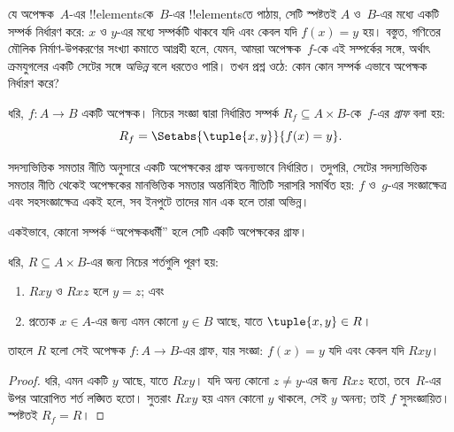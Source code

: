 \documentclass[../../../include/open-logic-section]{subfiles}
\begin{document}


\begin{explain}
যে অপেক্ষক~$A$-এর !!{element}sকে~$B$-এর !!{element}sতে পাঠায়, সেটি স্পষ্টতই $A$ ও~$B$-এর মধ্যে একটি সম্পর্ক নির্ধারণ করে: $x$ ও $y$-এর মধ্যে সম্পর্কটি থাকবে যদি এবং কেবল যদি $f(x) = y$ হয়। বস্তুত, গণিতের মৌলিক নির্মাণ-উপকরণের সংখ্যা কমাতে আগ্রহী হলে, যেমন, আমরা অপেক্ষক~$f$-কে এই সম্পর্কের সঙ্গে, অর্থাৎ ক্রমযুগলের একটি সেটের সঙ্গে \emph{অভিন্ন} বলে ধরতেও পারি। তখন প্রশ্ন ওঠে: কোন কোন সম্পর্ক এভাবে অপেক্ষক নির্ধারণ করে?
\end{explain}

\begin{defn}[অপেক্ষকের গ্রাফ] ধরি, $f\colon A \to B$ একটি অপেক্ষক।
নিচের সংজ্ঞা দ্বারা নির্ধারিত সম্পর্ক $R_f \subseteq A \times B$-কে~$f$-এর \emph{গ্রাফ} বলা হয়:
\[
R_f = \Setabs{\tuple{x,y}}{f(x) = y}.
\]
\end{defn}

\begin{explain}
সদস্যভিত্তিক সমতার নীতি অনুসারে একটি অপেক্ষকের গ্রাফ অনন্যভাবে নির্ধারিত। তদুপরি, সেটের সদস্যভিত্তিক সমতার নীতি থেকেই অপেক্ষকের মানভিত্তিক সমতার অন্তর্নিহিত নীতিটি সরাসরি সমর্থিত হয়: $f$ ও~$g$-এর সংজ্ঞাক্ষেত্র এবং সহসংজ্ঞাক্ষেত্র একই হলে, সব ইনপুটে তাদের মান এক হলে তারা অভিন্ন।

একইভাবে, কোনো সম্পর্ক ``অপেক্ষকধর্মী'' হলে সেটি একটি অপেক্ষকের গ্রাফ।
\end{explain}

\begin{prop}
ধরি, $R \subseteq A \times B$-এর জন্য নিচের শর্তগুলি পূরণ হয়:
\begin{enumerate}
\item $Rxy$ ও $Rxz$ হলে $y = z$; এবং
\item প্রত্যেক $x \in A$-এর জন্য এমন কোনো $y \in B$ আছে, যাতে $\tuple{x,
y} \in R$।
\end{enumerate}
তাহলে $R$ হলো সেই অপেক্ষক $f\colon A \to B$-এর গ্রাফ, যার সংজ্ঞা: $f(x) = y$ যদি এবং কেবল যদি $Rxy$।
\end{prop}

\begin{proof}
ধরি, এমন একটি $y$ আছে, যাতে $Rxy$। যদি অন্য কোনো $z \neq
y$-এর জন্য $Rxz$ হতো, তবে~$R$-এর উপর আরোপিত শর্ত লঙ্ঘিত হতো। সুতরাং $Rxy$ হয় এমন কোনো $y$ থাকলে, সেই $y$ অনন্য; তাই $f$ সুসংজ্ঞায়িত। স্পষ্টতই $R_f = R$।
\end{proof}
\end{document}
